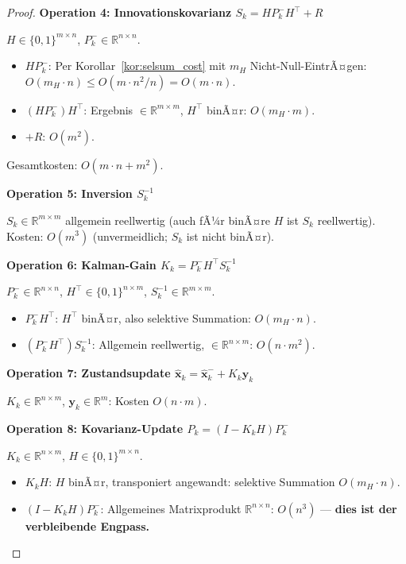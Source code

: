 ﻿\documentclass[a4paper,12pt]{article}
\theoremstyle{definition}
\begin{document}
\begin{proof}
\medskip
\textbf{Operation 4: Innovationskovarianz $S_k = H P_k^- H^\top + R$}

$H \in \{0,1\}^{m\times n}$, $P_k^- \in \mathbb{R}^{n\times n}$.
\begin{itemize}
    \item $HP_k^-$: Per Korollar~\ref{kor:selsum_cost} mit $m_H$ Nicht-Null-EintrÃ¤gen:
          $O(m_H \cdot n) \leq O(m \cdot n^2 / n) = O(m \cdot n)$.
    \item $(HP_k^-)H^\top$: Ergebnis $\in \mathbb{R}^{m\times m}$, $H^\top$ binÃ¤r:
          $O(m_H \cdot m)$.
    \item $+R$: $O(m^2)$.
\end{itemize}
Gesamtkosten: $O(m \cdot n + m^2)$.

\medskip
\textbf{Operation 5: Inversion $S_k^{-1}$}

$S_k \in \mathbb{R}^{m\times m}$ allgemein reellwertig (auch fÃ¼r binÃ¤re $H$
ist $S_k$ reellwertig). Kosten: $O(m^3)$ (unvermeidlich; $S_k$ ist nicht binÃ¤r).

\medskip
\textbf{Operation 6: Kalman-Gain $K_k = P_k^- H^\top S_k^{-1}$}

$P_k^- \in \mathbb{R}^{n\times n}$, $H^\top \in \{0,1\}^{n\times m}$, $S_k^{-1} \in \mathbb{R}^{m\times m}$.
\begin{itemize}
    \item $P_k^- H^\top$: $H^\top$ binÃ¤r, also selektive Summation: $O(m_H \cdot n)$.
    \item $(P_k^- H^\top) S_k^{-1}$: Allgemein reellwertig, $\in \mathbb{R}^{n\times m}$:
          $O(n \cdot m^2)$.
\end{itemize}

\medskip
\textbf{Operation 7: Zustandsupdate $\hat{\mathbf{x}}_k = \hat{\mathbf{x}}_k^- + K_k \mathbf{y}_k$}

$K_k \in \mathbb{R}^{n\times m}$, $\mathbf{y}_k \in \mathbb{R}^m$: Kosten $O(n \cdot m)$.

\medskip
\textbf{Operation 8: Kovarianz-Update $P_k = (I - K_k H) P_k^-$}

$K_k \in \mathbb{R}^{n\times m}$, $H \in \{0,1\}^{m\times n}$.
\begin{itemize}
    \item $K_k H$: $H$ binÃ¤r, transponiert angewandt: selektive Summation
          $O(m_H \cdot n)$.
    \item $(I - K_kH) P_k^-$: Allgemeines Matrixprodukt $\mathbb{R}^{n\times n}$:
          $O(n^3)$ --- \textbf{dies ist der verbleibende Engpass.}
\end{itemize}


\end{proof}
\end{document}
